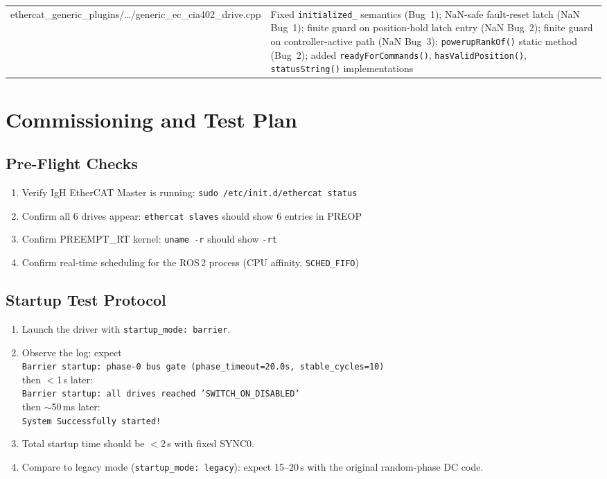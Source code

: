 \documentclass[11pt,a4paper]{article}
\begin{document}
\begin{longtable}{@{}>{\ttfamily\small}p{7cm} p{8.5cm}@{}}
  ethercat\_generic\_plugins/\ldots/generic\_ec\_cia402\_drive.cpp &
    Fixed \texttt{initialized\_} semantics (Bug~1);
    NaN-safe fault-reset latch (NaN Bug~1);
    finite guard on position-hold latch entry (NaN Bug~2);
    finite guard on controller-active path (NaN Bug~3);
    \texttt{powerupRankOf()} static method (Bug~2);
    added \texttt{readyForCommands()}, \texttt{hasValidPosition()},
    \texttt{statusString()} implementations \\
\end{longtable}

\section{Commissioning and Test Plan}
\label{sec:testplan}

\subsection{Pre-Flight Checks}

\begin{enumerate}[nosep]
  \item Verify IgH EtherCAT Master is running:
        \texttt{sudo /etc/init.d/ethercat status}
  \item Confirm all 6 drives appear:
        \texttt{ethercat slaves} should show 6 entries in PREOP
  \item Confirm PREEMPT\_RT kernel: \texttt{uname -r} should show \texttt{-rt}
  \item Confirm real-time scheduling for the ROS\,2 process (CPU affinity,
        \texttt{SCHED\_FIFO})
\end{enumerate}

\subsection{Startup Test Protocol}

\begin{enumerate}
  \item Launch the driver with \texttt{startup\_mode: barrier}.
  \item Observe the log: expect\\
        \texttt{Barrier startup: phase-0 bus gate (phase\_timeout=20.0s, stable\_cycles=10)}\\
        then $<$1\,s later:\\
        \texttt{Barrier startup: all drives reached 'SWITCH\_ON\_DISABLED'}\\
        then $\sim$50\,ms later:\\
        \texttt{System Successfully started!}
  \item Total startup time should be $<$2\,s with fixed SYNC0.
  \item Compare to legacy mode (\texttt{startup\_mode: legacy}): expect
        15--20\,s with the original random-phase DC code.
\end{enumerate}
\end{document}
